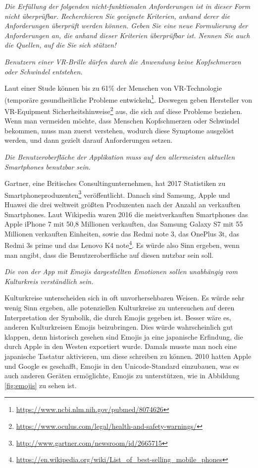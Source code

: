 \documentclass[
  ngerman,
  DIV=14
]{scrartcl}
\begin{document}
\emph{Die Erfüllung der folgenden nicht-funktionalen Anforderungen ist in dieser Form nicht überprüfbar. Recherchieren Sie geeignete Kriterien, anhand derer die Anforderungen überprüft werden können. Geben Sie eine neue Formulierung der Anforderungen an, die anhand dieser Kriterien überprüfbar ist. Nennen Sie auch die Quellen, auf die Sie sich stützen!}

\medskip\noindent
\emph{Benutzern einer VR-Brille dürfen durch die Anwendung keine Kopfschmerzen oder Schwindel entstehen.}

\medskip\noindent
Laut einer Stude können bis zu 61\% der Menschen von VR-Technologie (temporäre gesundheitliche Probleme entwickeln\footnote{\url{https://www.ncbi.nlm.nih.gov/pubmed/8074626}}. Deswegen geben Hersteller von VR-Equipment Sicherheitshinweise\footnote{\url{https://www.oculus.com/legal/health-and-safety-warnings/}} aus, die sich auf diese Probleme beziehen. Wenn man vermeiden möchte, dass Menschen Kopfschmerzen oder Schwindel bekommen, muss man zuerst verstehen, wodurch diese Symptome ausgelöst werden, und dann gezielt darauf Anforderungen setzen.

\bigskip\noindent
\emph{Die Benutzeroberfläche der Applikation muss auf den allermeisten aktuellen Smartphones benutzbar sein.}

\medskip\noindent
Gartner, eine Britisches Consultingunternehmen, hat 2017 Statistiken zu Smartphoneproduzenten\footnote{\url{http://www.gartner.com/newsroom/id/2665715}} veröffentlicht. Danach sind Samsung, Apple und Huawei die drei weltweit größten Produzenten nach der Anzahl an verkauften Smartphones. Laut Wikipedia waren 2016 die meistverkauften Smartphones das Apple iPhone 7 mit 50,8 Millionen verkauften, das Samsung Galaxy S7 mit 55 Millionen verkauften Einheiten, sowie das Redmi note 3, das OnePlus 3t, das Redmi 3s prime und das Lenovo K4 note\footnote{\url{https://en.wikipedia.org/wiki/List_of_best-selling_mobile_phones}}. Es würde also Sinn ergeben, wenn man angibt, dass die Benutzeroberfläche auf diesen nutzbar sein soll.

\bigskip\noindent
\emph{Die von der App mit Emojis dargestellten Emotionen sollen unabhängig vom Kulturkreis verständlich sein.}

\medskip\noindent
Kulturkreise unterscheiden sich in oft unvorhersehbaren Weisen. Es würde sehr wenig Sinn ergeben, alle potenziellen Kulturkreise zu untersuchen auf deren Interpretation der Symbolik, die durch Emojis gegeben ist. Besser wäre es, anderen Kulturkreisen Emojis beizubringen. Dies würde wahrscheinlich gut klappen, denn historisch gesehen sind Emojis ja eine japanische Erfindung, die durch Apple in den Westen exportiert wurde. Damals musste man noch eine japanische Tastatur aktivieren, um diese schreiben zu können. 2010 hatten Apple und Google es geschafft, Emojis in den Unicode-Standard einzubauen, was es auch anderen Geräten ermöglichte, Emojis zu unterstützen, wie in Abbildung \ref{fig:emojis} zu sehen ist.
\end{document}
